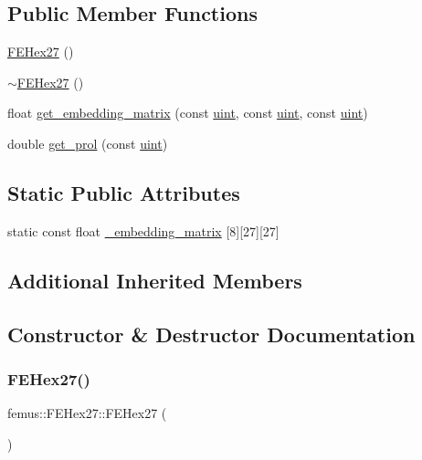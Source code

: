 \subsection*{Public Member Functions}
\begin{DoxyCompactItemize}
\item 
\mbox{\hyperlink{classfemus_1_1_f_e_hex27_a31c28c2432aa19dc9cac8b8d6952acbb}{F\+E\+Hex27}} ()
\item 
\mbox{\hyperlink{classfemus_1_1_f_e_hex27_a4423c27701fafe1a1546c0dc66c94b48}{$\sim$\+F\+E\+Hex27}} ()
\item 
float \mbox{\hyperlink{classfemus_1_1_f_e_hex27_a0bfb79afd1a19396983b0ea03daf00ff}{get\+\_\+embedding\+\_\+matrix}} (const \mbox{\hyperlink{_typedefs_8hpp_a91ad9478d81a7aaf2593e8d9c3d06a14}{uint}}, const \mbox{\hyperlink{_typedefs_8hpp_a91ad9478d81a7aaf2593e8d9c3d06a14}{uint}}, const \mbox{\hyperlink{_typedefs_8hpp_a91ad9478d81a7aaf2593e8d9c3d06a14}{uint}})
\item 
double \mbox{\hyperlink{classfemus_1_1_f_e_hex27_aa0a6cf0465e5c48c4b5ebf4a4e407124}{get\+\_\+prol}} (const \mbox{\hyperlink{_typedefs_8hpp_a91ad9478d81a7aaf2593e8d9c3d06a14}{uint}})
\end{DoxyCompactItemize}
\subsection*{Static Public Attributes}
\begin{DoxyCompactItemize}
\item 
static const float \mbox{\hyperlink{classfemus_1_1_f_e_hex27_af91845b451a5bb5249886e23ee6786a0}{\+\_\+embedding\+\_\+matrix}} \mbox{[}8\mbox{]}\mbox{[}27\mbox{]}\mbox{[}27\mbox{]}
\end{DoxyCompactItemize}
\subsection*{Additional Inherited Members}


\subsection{Constructor \& Destructor Documentation}
\mbox{\label{classfemus_1_1_f_e_hex27_a31c28c2432aa19dc9cac8b8d6952acbb}} 
\subsubsection{\texorpdfstring{F\+E\+Hex27()}{FEHex27()}}
{\footnotesize\ttfamily femus\+::\+F\+E\+Hex27\+::\+F\+E\+Hex27 (\begin{DoxyParamCaption}{ }\end{DoxyParamCaption})}

